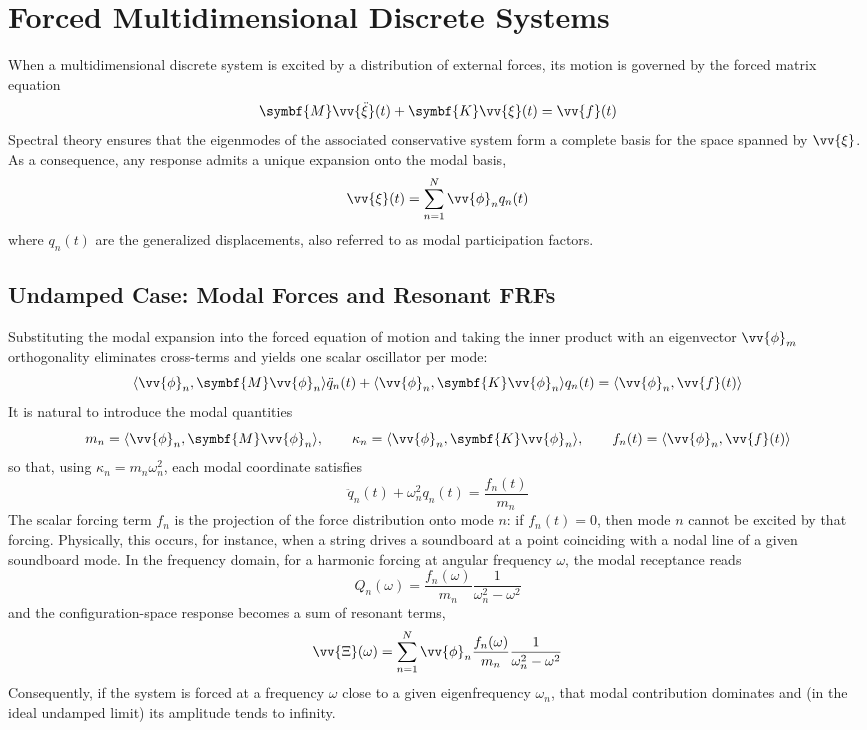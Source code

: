 \section{Forced Multidimensional Discrete Systems}

When a multidimensional discrete system is excited by a distribution of external forces, its motion is governed by the forced matrix equation
\[
\symbf{M}\vv{\ddot{\xi}}(t) + \symbf{K}\vv{\xi}(t) = \vv{f}(t)
\]
Spectral theory ensures that the eigenmodes of the associated conservative system form a complete basis for the space spanned by \( \vv{\xi} \). As a consequence, any response admits a unique expansion onto the modal basis,
\[
\vv{\xi}(t) = \sum_{n = 1}^{N}\vv{\phi}_n q_n(t)
\]
where \( q_n(t) \) are the generalized displacements, also referred to as modal participation factors. 

\subsection{Undamped Case: Modal Forces and Resonant FRFs}

Substituting the modal expansion into the forced equation of motion and taking the inner product with an eigenvector \( \vv{\phi}_m \) orthogonality eliminates cross-terms and yields one scalar oscillator per mode:
\[
\langle \vv{\phi}_n,\symbf{M}\vv{\phi}_n\rangle \ddot{q}_n(t)
 + \langle \vv{\phi}_n,\symbf{K}\vv{\phi}_n\rangle q_n(t)
 = \langle \vv{\phi}_n,\vv{f}(t)\rangle
\]
It is natural to introduce the modal quantities
\[
m_n = \langle \vv{\phi}_n,\symbf{M}\vv{\phi}_n\rangle,
\qquad
\kappa_n = \langle \vv{\phi}_n,\symbf{K}\vv{\phi}_n\rangle,
\qquad
f_n(t) = \langle \vv{\phi}_n,\vv{f}(t)\rangle
\]
so that, using \( \kappa_n = m_n\omega_n^2 \), each modal coordinate satisfies
\[
\ddot{q}_n(t) + \omega_n^2 q_n(t) = \frac{f_n(t)}{m_n}
\]
The scalar forcing term \( f_n \) is the projection of the force distribution onto mode \( n \): if \( f_n(t) = 0 \), then mode \( n \) cannot be excited by that forcing. Physically, this occurs, for instance, when a string drives a soundboard at a point coinciding with a nodal line of a given soundboard mode. In the frequency domain, for a harmonic forcing at angular frequency \( \omega \), the modal receptance reads
\[
Q_n(\omega) = \frac{f_n(\omega)}{m_n} \frac{1}{\omega_n^2 - \omega^2}
\]
and the configuration-space response becomes a sum of resonant terms,
\[
\vv{\Xi}(\omega) = \sum_{n = 1}^{N} \vv{\phi}_n\frac{f_n(\omega)}{m_n} \frac{1}{\omega_n^2 - \omega^2}
\]
Consequently, if the system is forced at a frequency \( \omega \) close to a given eigenfrequency \( \omega_n \), that modal contribution dominates and (in the ideal undamped limit) its amplitude tends to infinity.

